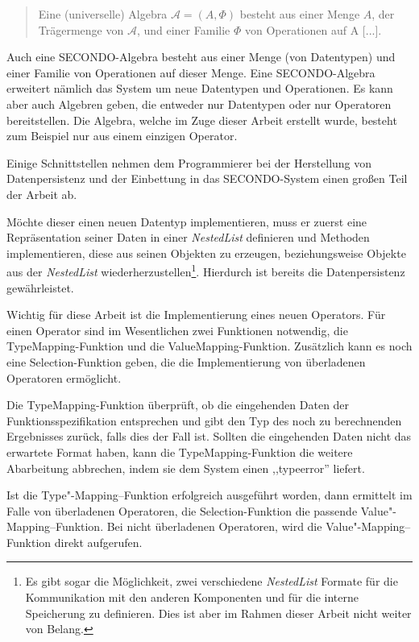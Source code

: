 \begin{quotation}
Eine (universelle) Algebra $\mathcal{A} = (A,\Phi)$ besteht aus einer Menge
$A$, der Trägermenge von $\mathcal{A}$, und einer Familie $\Phi$ von Operationen auf A [...].
\end{quotation} 

Auch eine SECONDO-Algebra besteht aus einer Menge (von Datentypen) und einer Familie von Operationen auf dieser Menge. Eine SECONDO-Algebra erweitert nämlich das System um neue Datentypen und Operationen. Es kann aber auch Algebren geben, die entweder nur Datentypen oder nur Operatoren bereitstellen. Die Algebra, welche im Zuge dieser Arbeit erstellt wurde, besteht zum Beispiel nur aus einem einzigen Operator.

Einige Schnittstellen nehmen dem Programmierer bei der Herstellung von Datenpersistenz und der Einbettung in das SECONDO-System  einen großen Teil der Arbeit ab.

Möchte dieser einen neuen Datentyp implementieren, muss er zuerst eine Repräsentation seiner Daten in einer \textit{NestedList} definieren und Methoden implementieren, diese aus seinen Objekten zu erzeugen, beziehungsweise Objekte aus der \textit{NestedList} wiederherzustellen\footnote{Es gibt sogar die Möglichkeit, zwei verschiedene \textit{NestedList} Formate für die Kommunikation mit den anderen Komponenten und für die interne Speicherung zu definieren. Dies ist aber im Rahmen dieser Arbeit nicht weiter von Belang.}. Hierdurch ist bereits die Datenpersistenz gewährleistet.

Wichtig für diese Arbeit ist die Implementierung eines neuen Operators. Für einen Operator sind im Wesentlichen zwei Funktionen notwendig, die TypeMapping-Funktion und die ValueMapping-Funktion. Zusätzlich kann es noch eine Selection-Funktion geben, die die Implementierung von überladenen Operatoren ermöglicht.

Die TypeMapping-Funktion überprüft, ob die eingehenden Daten der Funktionsspezifikation entsprechen und gibt den Typ des noch zu berechnenden Ergebnisses zurück, falls dies der Fall ist. Sollten die eingehenden Daten nicht das erwartete Format haben, kann die TypeMapping-Funktion die weitere Abarbeitung abbrechen, indem sie dem System einen ,,typeerror'' liefert.

Ist die Type"-Mapping--Funktion erfolgreich ausgeführt worden, dann ermittelt im Falle von überladenen Operatoren, die Selection-Funktion die passende Value"-Mapping--Funktion. Bei nicht überladenen Operatoren, wird die Value"-Mapping--Funktion direkt aufgerufen.

